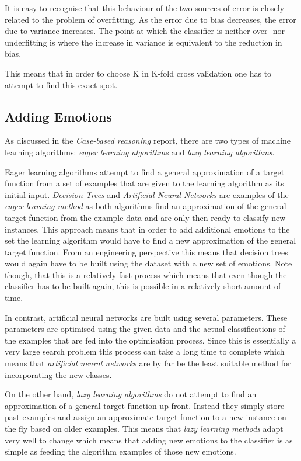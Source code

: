 \documentclass[10pt,a4paper]{article}
\begin{document}
It is easy to recognise that this behaviour of the two sources of error is closely related to the problem of overfitting. As the error due to bias decreases, the error due to variance increases. The point at which the classifier is neither over- nor underfitting is where the increase in variance is equivalent to the reduction in bias.

This means that in order to choose K in K-fold cross validation one has to attempt to find this exact spot.

\subsection{Adding Emotions}
As discussed in the \emph{Case-based reasoning} report, there are two types of machine learning algorithms: \emph{eager learning algorithms} and \emph{lazy learning algorithms}. 

Eager learning algorithms attempt to find a general approximation of a target function from a set of examples that are given to the learning algorithm as its initial input. \emph{Decision Trees} and \emph{Artificial Neural Networks} are examples of the \emph{eager learning method} as both algorithms find an approximation of the general target function from the example data and are only then ready to classify new instances. This approach means that in order to add additional emotions to the set the learning algorithm would have to find a new approximation of the general target function. From an engineering perspective this means that decision trees would again have to be built using the dataset with a new set of emotions. Note though, that this is a relatively fast process which means that even though the classifier has to be built again, this is possible in a relatively short amount of time.

In contrast, artificial neural networks are built using several parameters. These parameters are optimised using the given data and the actual classifications of the examples that are fed into the optimisation process. Since this is essentially a very large search problem this process can take a long time to complete which means that \emph{artificial neural networks} are by far be the least suitable method for incorporating the new classes.

On the other hand, \emph{lazy learning algorithms} do not attempt to find an approximation of a general target function up front. Instead they simply store past examples and assign an approximate target function to a new instance on the fly based on older examples. This means that \emph{lazy learning methods} adapt very well to change which means that adding new emotions to the classifier is as simple as feeding the algorithm examples of those new emotions.
\end{document}
